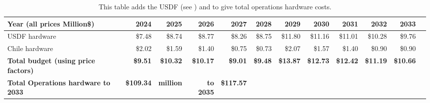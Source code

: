 \tiny \begin{longtable} { |p{}  |r  |r  |r  |r  |r  |r  |r  |r  |r  |r  |r |} 
\caption{This table adds the USDF (see ) and  to give total operations hardware costs. \label{tab:opsSummary}}\\ 
\hline 
\textbf{Year  (all prices Million\$)}&\textbf{2024}&\textbf{2025}&\textbf{2026}&\textbf{2027}&\textbf{2028}&\textbf{2029}&\textbf{2030}&\textbf{2031}&\textbf{2032}&\textbf{2033} \\ \hline
{USDF hardware}&{\$7.48}&{\$8.74}&{\$8.77}&{\$8.26}&{\$8.75}&{\$11.80}&{\$11.16}&{\$11.01}&{\$10.28}&{\$9.76} \\ \hline
{Chile hardware}&{\$2.02}&{\$1.59}&{\$1.40}&{\$0.75}&{\$0.73}&{\$2.07}&{\$1.57}&{\$1.40}&{\$0.90}&{\$0.90} \\ \hline
\textbf{Total budget (using price factors)}&\textbf{\$9.51}&\textbf{\$10.32}&\textbf{\$10.17}&\textbf{\$9.01}&\textbf{\$9.48}&\textbf{\$13.87}&\textbf{\$12.73}&\textbf{\$12.42}&\textbf{\$11.19}&\textbf{\$10.66} \\ \hline
\textbf{Total Operations hardware to 2033}&\textbf{\$109.34}&\textbf{million}&\textbf{to 2035}&\textbf{\$117.57}&&&&&& \\ \hline
\end{longtable} \normalsize
